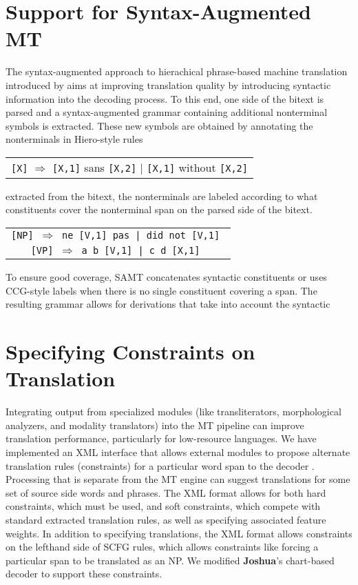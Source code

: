 \documentclass[11pt]{article}
\newcommand{\joshua}{\textbf{Joshua}\xspace}
\begin{document}
\section{Support for Syntax-Augmented MT}
The syntax-augmented approach to hierachical phrase-based machine
translation introduced by  aims at improving
translation quality by introducing syntactic information into the
decoding process. To this end, one side of the bitext is parsed and a
syntax-augmented grammar containing additional nonterminal symbols is
extracted. These new symbols are obtained by annotating the
nonterminals in Hiero-style rules
\begin{center}
\begin{tabular}{c}
  {\small \tt [X]} $\Rightarrow$ {\small \tt [X,1]} sans {\small \tt [X,2]} 
  $\vert$ {\tt \small [X,1]} without {\small \tt [X,2]} \\
\end{tabular}
\end{center}
extracted from the bitext, the nonterminals are labeled according
to what constituents cover the nonterminal span on the parsed side of
the bitext. 
\begin{center}
\begin{tabular}{c}
  {\small \tt [NP] $\Rightarrow$  ne [V,1] pas | did not [V,1] } \\
  {\small \tt [VP] $\Rightarrow$  a b [V,1] | c d [X,1] } 
\end{tabular}
\end{center}
To ensure good coverage, SAMT concatenates syntactic constituents or
uses CCG-style labels when there is no single constituent covering a
span. The resulting grammar allows for derivations that take into
account the syntactic

\section{Specifying Constraints on Translation}

Integrating output from specialized modules (like transliterators, morphological analyzers, and modality translators) into the MT pipeline can improve translation performance, particularly for low-resource languages. We have implemented an XML interface that allows external modules to propose alternate translation rules (constraints) for a particular word span to the decoder \cite{PBML-2010-Joshua-modules}. Processing that is separate from the MT engine can suggest translations for some set of source side words and phrases. The XML format allows for both hard constraints, which must be used, and soft constraints, which compete with standard extracted translation rules, as well as specifying associated feature weights. In addition to specifying translations, the XML format allows constraints on the lefthand side of SCFG rules, which allows constraints like forcing a particular span to be translated as an NP.  We modified \joshua's chart-based decoder to support these constraints. 
\end{document}
